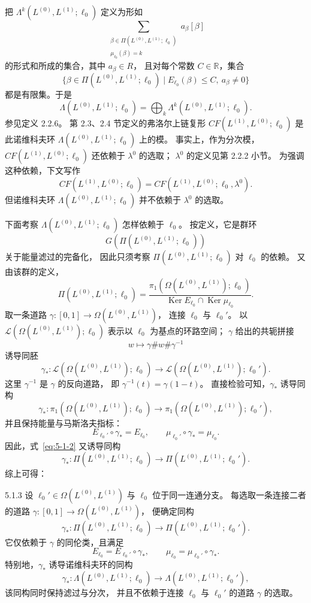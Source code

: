 把 $\Lambda^k(L^{(0)},L^{(1)};\ell_0)$
定义为形如
\[
\sum_{\substack{\beta\in\Pi(L^{(0)},L^{(1)};\ell_0)\\
                 \mu_{\ell_0}(\beta)=k}}
a_\beta[\beta]
\]
的形式和所成的集合，其中 $a_\beta\in R$，
且对每个常数 $C\in\mathbb R$，集合
\[
\{\beta\in\Pi(L^{(0)},L^{(1)};\ell_0)
\mid E_{\ell_0}(\beta)\leq C,\ a_\beta\ne0\}
\]
都是有限集。于是
\[
\Lambda(L^{(0)},L^{(1)};\ell_0)
=\bigoplus_k\Lambda^k(L^{(0)},L^{(1)};\ell_0).
\]
参见定义 2.2.6。
第 2.3、2.4 节定义的弗洛尔上链复形
$CF(L^{(1)},L^{(0)};\ell_0)$
是此诺维科夫环
$\Lambda(L^{(0)},L^{(1)};\ell_0)$ 上的模。
事实上，作为分次模，
$CF(L^{(1)},L^{(0)};\ell_0)$
还依赖于 $\lambda^0$ 的选取；
$\lambda^0$ 的定义见第 2.2.2 小节。
为强调这种依赖，下文写作
\[
CF(L^{(1)},L^{(0)};\ell_0)
=CF(L^{(1)},L^{(0)};\ell_0,\lambda^0).
\]
但诺维科夫环
$\Lambda(L^{(0)},L^{(1)};\ell_0)$
并不依赖于 $\lambda^0$ 的选取。

下面考察
$\Lambda(L^{(0)},L^{(1)};\ell_0)$
怎样依赖于 $\ell_0$。
按定义，它是群环
\[
G(\Pi(L^{(0)},L^{(1)};\ell_0))
\]
关于能量滤过的完备化，
因此只须考察
$\Pi(L^{(0)},L^{(1)};\ell_0)$
对 $\ell_0$ 的依赖。
又由该群的定义，
\[
\Pi(L^{(0)},L^{(1)};\ell_0)
=
\frac{\pi_1(\Omega(L^{(0)},L^{(1)});\ell_0)}
{\operatorname{Ker}E_{\ell_0}
 \cap\operatorname{Ker}\mu_{\ell_0}}.
\]
取一条道路
$\gamma:[0,1]\to\Omega(L^{(0)},L^{(1)})$，
连接 $\ell_0$ 与 $\ell_0'$。
以 $\mathcal L(\Omega(L^{(0)},L^{(1)});\ell_0)$
表示以 $\ell_0$ 为基点的环路空间；
$\gamma$ 给出的共轭拼接
\[
w\longmapsto\gamma\#w\#\gamma^{-1}
\]
诱导同胚
\[
\gamma_*:
\mathcal L(\Omega(L^{(0)},L^{(1)});\ell_0)
\longrightarrow
\mathcal L(\Omega(L^{(0)},L^{(1)});\ell_0').
\]
这里 $\gamma^{-1}$ 是 $\gamma$ 的反向道路，
即 $\gamma^{-1}(t)=\gamma(1-t)$。
直接检验可知，$\gamma_*$ 诱导同构
\begin{equation}
\gamma_*:
\pi_1(\Omega(L^{(0)},L^{(1)});\ell_0)
\longrightarrow
\pi_1(\Omega(L^{(0)},L^{(1)});\ell_0'),
\tag{5.1.2}\label{eq:5-1-2}
\end{equation}
并且保持能量与马斯洛夫指标：
\[
E_{\ell_0'}\circ\gamma_*=E_{\ell_0},
\qquad
\mu_{\ell_0'}\circ\gamma_*=\mu_{\ell_0}.
\]
因此，式~\eqref{eq:5-1-2}
又诱导同构
\[
\gamma_*:\Pi(L^{(0)},L^{(1)};\ell_0)
\longrightarrow
\Pi(L^{(0)},L^{(1)};\ell_0').
\]
综上可得：

\begin{proposition}{5.1.3}\label{prop:5-1-3}
设 $\ell_0'\in\Omega(L^{(0)},L^{(1)})$
与 $\ell_0$ 位于同一连通分支。
每选取一条连接二者的道路
$\gamma:[0,1]\to\Omega(L^{(0)},L^{(1)})$，
便确定同构
\[
\gamma_*:\Pi(L^{(0)},L^{(1)};\ell_0)
\longrightarrow
\Pi(L^{(0)},L^{(1)};\ell_0').
\]
它仅依赖于 $\gamma$ 的同伦类，且满足
\[
E_{\ell_0}=E_{\ell_0'}\circ\gamma_*,
\qquad
\mu_{\ell_0}=\mu_{\ell_0'}\circ\gamma_*.
\]
特别地，$\gamma_*$ 诱导诺维科夫环的同构
\[
\gamma_*:\Lambda(L^{(0)},L^{(1)};\ell_0)
\longrightarrow
\Lambda(L^{(0)},L^{(1)};\ell_0'),
\]
该同构同时保持滤过与分次，
并且不依赖于连接 $\ell_0$ 与 $\ell_0'$
的道路 $\gamma$ 的选取。
\end{proposition}

